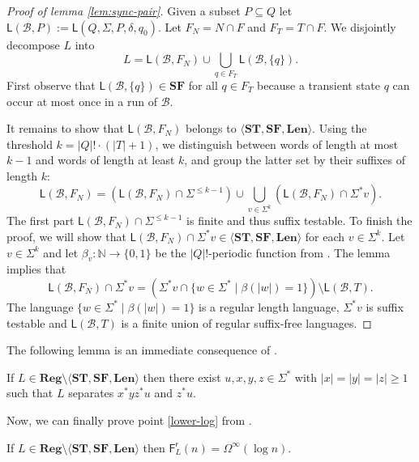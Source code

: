 \documentclass{article}\usepackage[a4paper,margin=20mm]{geometry}
\newcommand{\N}{\mathbb{N}}
\newcommand{\B}{\mathcal{B}}
\newcommand{\F}{\mathsf{F}}
\renewcommand{\L}{\mathsf{L}}
\renewcommand{\r}{\mathsf{r}}
\newcommand{\Reg}{\mathbf{Reg}}
\newcommand{\Len}{\mathbf{Len}}
\newcommand{\ST}{\mathbf{ST}}
\newcommand{\SF}{\mathbf{SF}}
\renewcommand{\geq}{\geqslant}
\renewcommand{\leq}{\leqslant}
\renewcommand{\ge}{\geq}
\renewcommand{\le}{\leq}
\newcommand{\Omegainf}{\Omega^{\scriptscriptstyle{\infty}}}
\begin{document}
\begin{proof}[Proof of lemma \ref{lem:sync-pair}]
Given a subset $P \subseteq Q$ let $\L(\B,P) := \L(Q,\Sigma,P,\delta,q_0)$.
Let $F_N = N \cap F$ and $F_T = T \cap F$.
We disjointly decompose $L$ into
\[
	L = \L(\B, F_N) \cup \bigcup_{q \in F_T} \L(\B, \{q\}).
\]
First observe that $\L(\B, \{q\}) \in \SF$ for all $q \in F_T$
because a transient state $q$ can occur at most once in a run of $\B$.

It remains to show  that  $\L(\B, F_N)$ belongs to $\langle \ST,\SF,\Len \rangle$.
Using the threshold $k=|Q|! \cdot (|T|+1)$,
we distinguish between words of length at most $k-1$ and words of length at least $k$,
and group the latter set by their suffixes of length $k$:
\[
	\L(\B, F_N) = (\L(\B, F_N) \cap \Sigma^{\le k-1})\cup\bigcup_{v\in\Sigma^{k}}(\L(\B, F_N) \cap \Sigma^* v).
\]
The first part $\L(\B, F_N) \cap \Sigma^{\le k-1}$ is finite and thus suffix testable.
To finish the proof, we will show that $\L(\B, F_N) \cap \Sigma^*v \in \langle \ST, \SF, \Len \rangle$
for each $v \in \Sigma^k$.
Let $v \in \Sigma^k$ and let $\beta_v \colon \N \to \{0,1\}$ be the $|Q|!$-periodic function from .
The lemma implies that
\[
	\L(\B, F_N) \cap \Sigma^*v = (\Sigma^*v \cap \{ w \in \Sigma^* \mid \beta(|w|) = 1 \}) \setminus \L(\B, T).
\]
The language $\{ w \in \Sigma^* \mid \beta(|w|) = 1 \}$ is 
a regular length language, $\Sigma^* v$ is suffix testable and $\L(\B, T)$ is a finite union of
regular suffix-free languages.
\end{proof}

The following lemma is an immediate consequence of .

\begin{lemma}\label{lemma:logprop}
If $L \in \Reg \setminus \langle \ST, \SF, \Len \rangle$
then there exist $u,x,y,z\in\Sigma^*$ with $|x|=|y|=|z| \ge 1$ such that
$L$ separates $x^*yz^*u$ and $z^*u$.
\end{lemma}
Now, we can finally prove point \ref{lower-log} from .

\begin{proposition}\label{lowerlognrandom}
If $L \in \Reg \setminus \langle \ST, \SF, \Len \rangle$
then $\F^\r_L(n) = \Omegainf(\log n)$.
\end{proposition}
\end{document}
